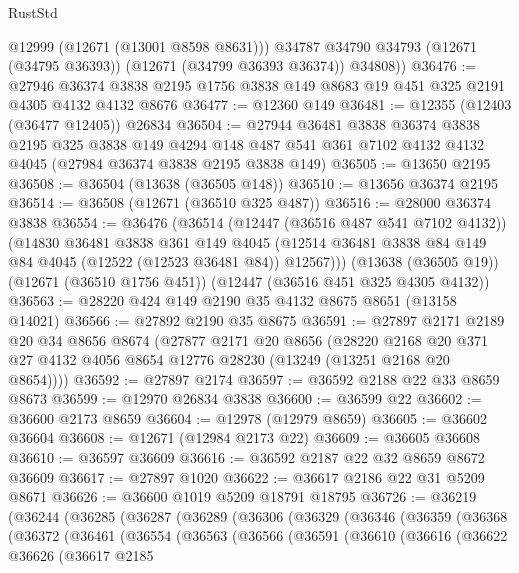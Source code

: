 \begin{lexlean}{RustStd}
\begin{coremodule}
          @12999
          (@12671 (@13001 @8598 @8631)))
        @34787
        @34790
        @34793
        (@12671 (@34795 @36393))
        (@12671 (@34799 @36393 @36374))
        @34808))
@36476 := @27946
    @36374
    @3838
    @2195
    @1756
    @3838
    @149
    @8683
    @19
    @451
    @325
    @2191
    @4305
    @4132
    @4132
    @8676
@36477 := @12360 @149
@36481 := @12355 (@12403 (@36477 @12405)) @26834
@36504 := @27944
    @36481
    @3838
    @36374
    @3838
    @2195
    @325
    @3838
    @149
    @4294
    @148
    @487
    @541
    @361
    @7102
    @4132
    @4132
    @4045
    (@27984 @36374 @3838 @2195 @3838 @149)
@36505 := @13650 @2195
@36508 := @36504 (@13638 (@36505 @148))
@36510 := @13656 @36374 @2195
@36514 := @36508 (@12671 (@36510 @325 @487))
@36516 := @28000 @36374 @3838
@36554 := @36476
    (@36514
      (@12447 (@36516 @487 @541 @7102 @4132))
      (@14830
        @36481
        @3838
        @361
        @149
        @4045
        (@12514 @36481 @3838 @84 @149 @84 @4045 (@12522 (@12523 @36481 @84)) @12567)))
    (@13638 (@36505 @19))
    (@12671 (@36510 @1756 @451))
    (@12447 (@36516 @451 @325 @4305 @4132))
@36563 := @28220 @424 @149 @2190 @35 @4132 @8675 @8651 (@13158 @14021)
@36566 := @27892 @2190 @35 @8675
@36591 := @27897
    @2171
    @2189
    @20
    @34
    @8656
    @8674
    (@27877
      @2171
      @20
      @8656
      (@28220 @2168 @20 @371 @27 @4132 @4056 @8654 @12776 @28230 (@13249 (@13251 @2168 @20 @8654))))
@36592 := @27897 @2174
@36597 := @36592 @2188 @22 @33 @8659 @8673
@36599 := @12970 @26834 @3838
@36600 := @36599 @22
@36602 := @36600 @2173 @8659
@36604 := @12978 (@12979 @8659)
@36605 := @36602 @36604
@36608 := @12671 (@12984 @2173 @22)
@36609 := @36605 @36608
@36610 := @36597 @36609
@36616 := @36592 @2187 @22 @32 @8659 @8672 @36609
@36617 := @27897 @1020
@36622 := @36617 @2186 @22 @31 @5209 @8671
@36626 := @36600 @1019 @5209 @18791 @18795
@36726 := @36219
    (@36244
      (@36285
        (@36287
          (@36289
            (@36306
              (@36329
                (@36346
                  (@36359
                    (@36368
                      (@36372
                        (@36461
                          (@36554
                            (@36563
                              (@36566
                                (@36591
                                  (@36610
                                    (@36616
                                      (@36622
                                        @36626
                                        (@36617
                                          @2185

\end{coremodule}
\end{lexlean}
